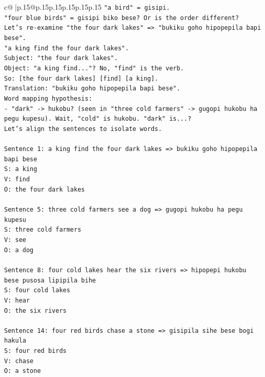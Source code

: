 \documentclass{article}
\begin{document}
{\begin{supertabular}{c@{$\;$}|p{.15\linewidth}@{}p{.15\linewidth}p{.15\linewidth}p{.15\linewidth}p{.15\linewidth}p{.15\linewidth}}
{{{\texttt{"a bird" = gisipi.} \\
\texttt{"four blue birds" = gisipi biko bese? Or is the order different?} \\
\texttt{Let's re{-}examine "the four dark lakes" => "bukiku goho hipopepila bapi bese".} \\
\texttt{"a king find the four dark lakes".} \\
\texttt{Subject: "the four dark lakes".} \\
\texttt{Object: "a king find..."? No, "find" is the verb.} \\
\texttt{So: {[}the four dark lakes{]} {[}find{]} {[}a king{]}.} \\
\texttt{Translation: "bukiku goho hipopepila bapi bese".} \\
\texttt{Word mapping hypothesis:} \\
\texttt{{-} "dark" {-}> hukobu? (seen in "three cold farmers" {-}> gugopi hukobu ha pegu kupesu). Wait, "cold" is hukobu. "dark" is...?} \\
\texttt{Let's align the sentences to isolate words.} \\
\\ 
\texttt{Sentence 1: a king find the four dark lakes => bukiku goho hipopepila bapi bese} \\
\texttt{S: a king} \\
\texttt{V: find} \\
\texttt{O: the four dark lakes} \\
\\ 
\texttt{Sentence 5: three cold farmers see a dog => gugopi hukobu ha pegu kupesu} \\
\texttt{S: three cold farmers} \\
\texttt{V: see} \\
\texttt{O: a dog} \\
\\ 
\texttt{Sentence 8: four cold lakes hear the six rivers => hipopepi hukobu bese pusosa lipipila bihe} \\
\texttt{S: four cold lakes} \\
\texttt{V: hear} \\
\texttt{O: the six rivers} \\
\\ 
\texttt{Sentence 14: four red birds chase a stone => gisipila sihe bese bogi hakula} \\
\texttt{S: four red birds} \\
\texttt{V: chase} \\
\texttt{O: a stone} \\
}}}
\end{supertabular}}
\end{document}
